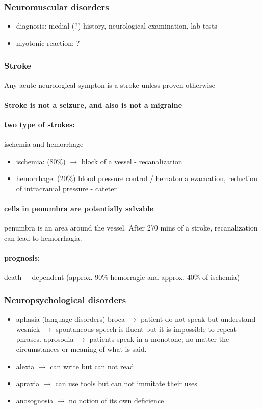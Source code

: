 \documentclass[12pt,article,oneside,a4paper]{memoir}
\begin{document}
\subsubsection{Neuromuscular disorders}
\begin{itemize}
\item diagnosis: medial (?) history, neurological examination, lab tests
\item myotonic reaction: ?
\end{itemize}

\subsubsection{Stroke} 
Any acute neurological sympton is a stroke unless proven otherwise
\paragraph{Stroke is not a seizure, and also is not a migraine}
\paragraph{two type of strokes:} ischemia and hemorrhage
\begin{itemize}
\item ischemia: (80\%) $\rightarrow$ block of a vessel - recanalization
\item hemorrhage: (20\%) blood pressure control / hematoma evacuation, reduction of intracranial pressure - cateter
\end{itemize}
\paragraph{cells in penumbra are potentially salvable} penumbra is an area around the vessel.
After 270 mins of a stroke, recanalization can lead to  hemorrhagia.
\paragraph{prognosis:} death + dependent (approx. 90\% hemorragic and approx. 40\% of ischemia)

\subsubsection{Neuropsychological disorders }
\begin{itemize}
\item aphasia (language disorders)
\subitem broca $\rightarrow$ patient do not speak but understand
\subitem wesnick $\rightarrow$ spontaneous speech is fluent but it is impossible
to repeat phrases.
\subitem aprosodia $\rightarrow$ patients speak in a monotone, no matter the 
circumstances or meaning of what is said.
\item alexia $\rightarrow$ can write but can not read
\item apraxia $\rightarrow$ can use tools but can not immitate their uses
\item anosognosia $\rightarrow$ no notion of its own deficience
\end{itemize}
\end{document}
